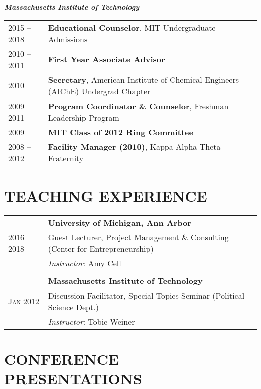 \documentclass[11pt]{article}
\newcommand{\quotejump}{\vspace{0.5em}}
\begin{document}
\textbf{\textit{Massachusetts Institute of Technology}}\quotejump
\begin{longtable}{R{2.2cm} L{14.8cm}}
2015 -- 2018 & \textbf{Educational Counselor}, MIT Undergraduate Admissions \\
2010 -- 2011 & \textbf{First Year Associate Advisor} \\
2010 & \textbf{Secretary}, American Institute of Chemical Engineers (AIChE) Undergrad Chapter \\
2009 -- 2011 & \textbf{Program Coordinator \& Counselor}, Freshman Leadership Program \\
2009 & \textbf{MIT Class of 2012 Ring Committee} \\
2008 -- 2012 & \textbf{Facility Manager (2010)}, Kappa Alpha Theta Fraternity \\
\end{longtable}

\section{TEACHING EXPERIENCE}
\begin{longtable}{R{2.2cm} L{14.8cm}}
& \textbf{University of Michigan, Ann Arbor} \\
2016 -- 2018 & Guest Lecturer, Project Management \& Consulting (Center for Entrepreneurship)\\
& \textit{Instructor}: Amy Cell \\ %
\\
& \textbf{Massachusetts Institute of Technology} \\
\textsc{\footnotesize Jan}  2012 & Discussion Facilitator, Special Topics Seminar (Political Science Dept.) \\
& \textit{Instructor}: Tobie Weiner
\end{longtable}


\section{CONFERENCE PRESENTATIONS}
\begin{quote}
\end{quote}
\end{document}

